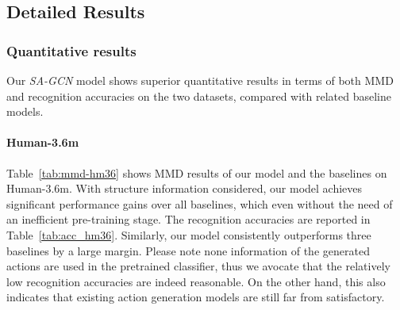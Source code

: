 \documentclass[runningheads]{llncs}
\begin{document}
\subsection{Detailed Results}
\subsubsection{Quantitative results}
Our {\it SA-GCN} model shows superior quantitative results in terms of both MMD and recognition accuracies on the two datasets, compared with related baseline models.
\paragraph{Human-3.6m}
Table~\ref{tab:mmd-hm36} shows MMD results of our model and the baselines on Human-3.6m. With structure information considered, our model achieves significant performance gains over all baselines, which even without the need of an inefficient pre-training stage. The recognition accuracies are reported in Table~\ref{tab:acc_hm36}. Similarly, our model consistently outperforms three baselines by a large margin. Please note none information of the generated actions are used in the pretrained classifier, thus we avocate that the relatively low recognition accuracies are indeed reasonable. On the other hand, this also indicates that existing action generation models are still far from satisfactory.
\end{document}
